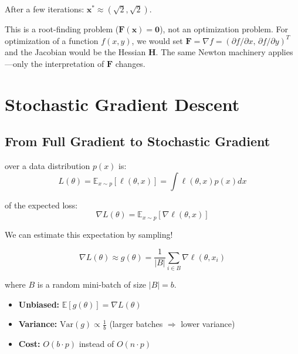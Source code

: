 After a few iterations: $\mathbf{x}^* \approx (\sqrt{2}, \sqrt{2})$.

 This is a root-finding problem ($\mathbf{F}(\mathbf{x}) = \mathbf{0}$), not an optimization problem. For optimization of a function $f(x,y)$, we would set $\mathbf{F} = \nabla f = ({\partial f}/{\partial x},\, {\partial f}/{\partial y})^T$ and the Jacobian would be the Hessian $\mathbf{H}$. The same Newton machinery applies---only the interpretation of $\mathbf{F}$ changes.



\newpage
\section{Stochastic Gradient Descent}

\subsection{From Full Gradient to Stochastic Gradient}

 over a data distribution $p(x)$ is:
\begin{equation}
    L(\theta) = \mathbb{E}_{x \sim p}[\ell(\theta, x)] = \int \ell(\theta, x) p(x) dx
\end{equation}


 of the expected loss:
\begin{equation}
    \nabla L(\theta) = \mathbb{E}_{x \sim p}[\nabla \ell(\theta, x)]
\end{equation}

 We can estimate this expectation by sampling!

\begin{equation}
    \nabla L(\theta) \approx g(\theta) = \frac{1}{|B|} \sum_{i \in B} \nabla \ell(\theta, x_i)
\end{equation}

where $B$ is a random mini-batch of size $|B| = b$.

\begin{itemize}
    \item \textbf{Unbiased:} $\mathbb{E}[g(\theta)] = \nabla L(\theta)$
    \item \textbf{Variance:} $\text{Var}(g) \propto \frac{1}{b}$ (larger batches $\Rightarrow$ lower variance)
    \item \textbf{Cost:} $O(b \cdot p)$ instead of $O(n \cdot p)$
\end{itemize}

